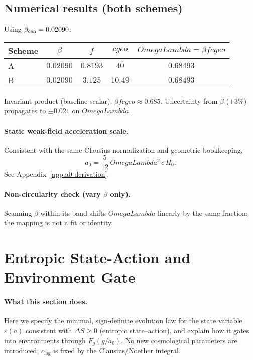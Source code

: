 \documentclass[aps,prd,onecolumn,superscriptaddress,nofootinbib]{revtex4-2}
\def\OmL{OmegaLambda}%
\def\cgeo{cgeo}%
\newcommand{\OmL}{\Omega_\Lambda}
\newcommand{\cgeo}{c_{\rm geo}}
\begin{document}
\subsection{Numerical results (both schemes)}
\label{sec:numerics}
Using $\beta_{\rm cen}=0.02090$:
\begin{center}
\begin{tabular}{l|c|c|c|c}
\hline
Scheme & $\beta$ & $f$ & $\cgeo$ & $\OmL=\beta f \cgeo$ \\
\hline
A & $0.02090$ & $0.8193$ & $40$ & $0.68493$ \\
B & $0.02090$ & $3.125$ & $10.49$ & $0.68493$ \\
\hline
\end{tabular}
\end{center}
Invariant product (baseline scalar): $\beta f \cgeo \approx 0.685$. Uncertainty from $\beta$ ($\pm3\%$) propagates to $\pm 0.021$ on $\OmL$.

\paragraph*{Static weak-field acceleration scale.}
Consistent with the same Clausius normalization and geometric bookkeeping,
\begin{equation}
a_0 = \frac{5}{12}\,\OmL^2\,c\,H_0.
\end{equation}
See Appendix~\ref{app:a0-derivation}.

\paragraph*{Non-circularity check (vary $\beta$ only).}
Scanning $\beta$ within its band shifts $\OmL$ linearly by the same fraction; the mapping is not a fit or identity.

\section{Entropic State-Action and Environment Gate}
\label{sec:state-action}

\paragraph*{What this section does.}
Here we specify the minimal, sign-definite evolution law for the state variable $\varepsilon(a)$ consistent with $\Delta S\!\ge\!0$ (entropic state–action), and explain how it gates into environments through $F_g(g/a_0)$. No new cosmological parameters are introduced; $c_{\log}$ is fixed by the Clausius/Noether integral.
\end{document}
